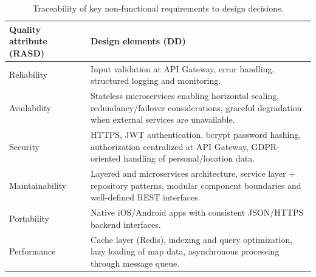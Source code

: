 \begin{table}[H]
    \centering
    \small
    \begin{tabularx}{\textwidth}{|p{}|X|}
        \hline
        \textbf{Quality attribute (RASD)} & \textbf{Design elements (DD)} \\
        \hline
        Reliability &
        Input validation at API Gateway, error handling, structured logging and monitoring. \\
        \hline
        Availability &
        Stateless microservices enabling horizontal scaling, redundancy/failover considerations, graceful degradation when external services are unavailable. \\
        \hline
        Security &
        HTTPS, JWT authentication, bcrypt password hashing, authorization centralized at API Gateway, GDPR-oriented handling of personal/location data. \\
        \hline
        Maintainability &
        Layered and microservices architecture, service layer + repository patterns, modular component boundaries and well-defined REST interfaces. \\
        \hline
        Portability &
        Native iOS/Android apps with consistent JSON/HTTPS backend interfaces.\\
        \hline
        Performance &
        Cache layer (Redis), indexing and query optimization, lazy loading of map data, asynchronous processing through message queue. \\
        \hline
    \end{tabularx}
    \caption{Traceability of key non-functional requirements to design decisions.}
    \label{tab:nfr_traceability}
\end{table}
